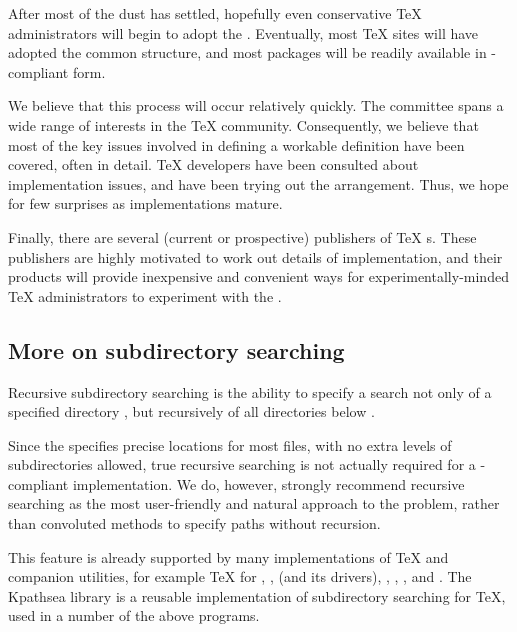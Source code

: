 \documentclass{tdsguide}
\begin{document}
After most of the dust has settled, hopefully even conservative \TeX{}
administrators will begin to adopt the .  Eventually, most
\TeX{} sites will have adopted the common structure, and most packages
will be readily available in -compliant form.

We believe that this process will occur relatively quickly.  The
 committee spans a wide range of interests in the \TeX{}
community.  Consequently, we believe that most of the key issues
involved in defining a workable  definition have been covered,
often in detail.  \TeX{} developers have been consulted about
implementation issues, and have been trying out the 
arrangement.  Thus, we hope for few surprises as implementations mature.

Finally, there are several (current or prospective) publishers of \TeX{}
s.  These publishers are highly motivated to work out
details of  implementation, and their products will provide
inexpensive and convenient ways for experimentally-minded \TeX{}
administrators to experiment with the .


\subsection{More on subdirectory searching}
\label{sec:More on subdirectory searching}

Recursive subdirectory searching is the ability to specify a search not
only of a specified directory , but recursively of all
directories below .

Since the  specifies precise locations for most files, with no
extra levels of subdirectories allowed, true recursive searching is not
actually required for a -compliant implementation. We do,
however, strongly recommend recursive searching as the most
user-friendly and natural approach to the problem, rather than
convoluted methods to specify paths without recursion.

This feature is already supported by many implementations of \TeX{} and
companion utilities, for example  \TeX{} for ,
,  (and its drivers),
, , ,
and .  The Kpathsea library is a reusable
implementation of subdirectory searching for \TeX{}, used in a number of
the above programs.
\end{document}
